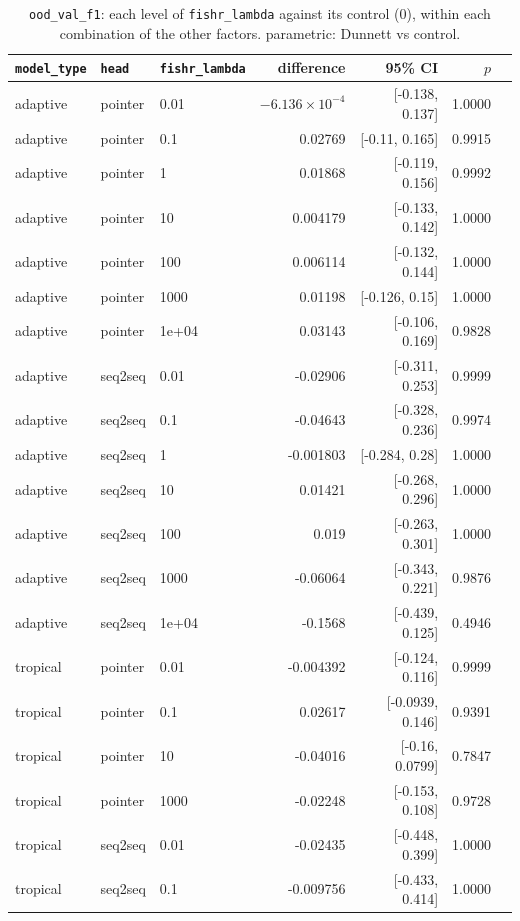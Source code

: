 \documentclass[10pt]{article}
\begin{document}
{\small
\begin{longtable}{lllrrrl}
\caption{\texttt{ood\_val\_f1}: each level of \texttt{fishr\_lambda} against its control (0), within each combination of the other factors. parametric: Dunnett vs control.}\label{tab:control-ood_val_f1}\\
\toprule
\texttt{model\_type} & \texttt{head} & \texttt{fishr\_lambda} & difference & 95\% CI & $p$ & \\
\midrule
\endhead
adaptive & pointer & 0.01 & $-6.136\times10^{-4}$ & [-0.138, 0.137] & 1.0000 & \\
adaptive & pointer & 0.1 & 0.02769 & [-0.11, 0.165] & 0.9915 & \\
adaptive & pointer & 1 & 0.01868 & [-0.119, 0.156] & 0.9992 & \\
adaptive & pointer & 10 & 0.004179 & [-0.133, 0.142] & 1.0000 & \\
adaptive & pointer & 100 & 0.006114 & [-0.132, 0.144] & 1.0000 & \\
adaptive & pointer & 1000 & 0.01198 & [-0.126, 0.15] & 1.0000 & \\
adaptive & pointer & 1e+04 & 0.03143 & [-0.106, 0.169] & 0.9828 & \\
adaptive & seq2seq & 0.01 & -0.02906 & [-0.311, 0.253] & 0.9999 & \\
adaptive & seq2seq & 0.1 & -0.04643 & [-0.328, 0.236] & 0.9974 & \\
adaptive & seq2seq & 1 & -0.001803 & [-0.284, 0.28] & 1.0000 & \\
adaptive & seq2seq & 10 & 0.01421 & [-0.268, 0.296] & 1.0000 & \\
adaptive & seq2seq & 100 & 0.019 & [-0.263, 0.301] & 1.0000 & \\
adaptive & seq2seq & 1000 & -0.06064 & [-0.343, 0.221] & 0.9876 & \\
adaptive & seq2seq & 1e+04 & -0.1568 & [-0.439, 0.125] & 0.4946 & \\
tropical & pointer & 0.01 & -0.004392 & [-0.124, 0.116] & 0.9999 & \\
tropical & pointer & 0.1 & 0.02617 & [-0.0939, 0.146] & 0.9391 & \\
tropical & pointer & 10 & -0.04016 & [-0.16, 0.0799] & 0.7847 & \\
tropical & pointer & 1000 & -0.02248 & [-0.153, 0.108] & 0.9728 & \\
tropical & seq2seq & 0.01 & -0.02435 & [-0.448, 0.399] & 1.0000 & \\
tropical & seq2seq & 0.1 & -0.009756 & [-0.433, 0.414] & 1.0000 & \\

\end{longtable}}
\end{document}
